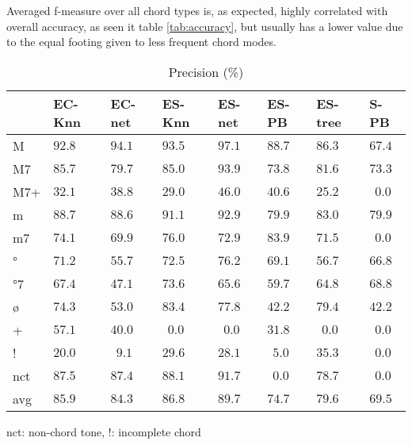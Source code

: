 \documentclass{article}
\begin{document}
Averaged f-measure over all chord types is, as expected, highly
correlated with overall accuracy, as seen it table \ref{tab:accuracy},
but usually has a lower value due to the equal footing given to less
frequent chord modes.

\begin{table}
  \centering
  \begin{tabular}{l|p{.5cm}p{.5cm}p{.5cm}p{.5cm}p{.5cm}p{.5cm}p{.5cm}}
   & EC-Knn&EC-net &ES-Knn &ES-net &ES-PB  &ES-tree&S-PB     \\
\hline                                             
M  &$92.8 $&$ 94.1$&$ 93.5$&$ 97.1$&$ 88.7$&$ 86.3$&$ 67.4$  \\
M7 &$85.7 $&$ 79.7$&$ 85.0$&$ 93.9$&$ 73.8$&$ 81.6$&$ 73.3$  \\
M7+&$32.1 $&$ 38.8$&$ 29.0$&$ 46.0$&$ 40.6$&$ 25.2$&$~~0.0$  \\
m  &$88.7 $&$ 88.6$&$ 91.1$&$ 92.9$&$ 79.9$&$ 83.0$&$ 79.9$  \\
m7 &$74.1 $&$ 69.9$&$ 76.0$&$ 72.9$&$ 83.9$&$ 71.5$&$~~0.0$  \\
°  &$71.2 $&$ 55.7$&$ 72.5$&$ 76.2$&$ 69.1$&$ 56.7$&$ 66.8$  \\
°7 &$67.4 $&$ 47.1$&$ 73.6$&$ 65.6$&$ 59.7$&$ 64.8$&$ 68.8$  \\
ø  &$74.3 $&$ 53.0$&$ 83.4$&$ 77.8$&$ 42.2$&$ 79.4$&$ 42.2$  \\
+  &$57.1 $&$ 40.0$&$~~0.0$&$~~0.0$&$ 31.8$&$~~0.0$&$~~0.0$  \\
!  &$20.0 $&$~~9.1$&$ 29.6$&$ 28.1$&$~~5.0$&$ 35.3$&$~~0.0$  \\
nct&$87.5 $&$ 87.4$&$ 88.1$&$ 91.7$&$~~0.0$&$ 78.7$&$~~0.0$  \\
avg&$85.9 $&$ 84.3$&$ 86.8$&$ 89.7$&$ 74.7$&$ 79.6$&$ 69.5$  \\

  \end{tabular}

\medskip

nct: non-chord tone, !: incomplete chord

  \caption{Precision (\%)}
  \label{tab:precision}
\end{table}
\end{document}
